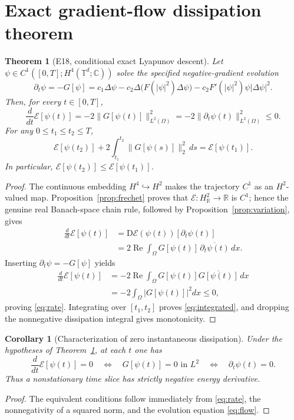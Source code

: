 \documentclass[11pt]{article}
\newtheorem{theorem}{Theorem}
\newtheorem{corollary}{Corollary}
\newcommand{\Om}{\Omega}
\newcommand{\EE}{\mathcal E}
\newcommand{\RR}{\mathbb R}
\newcommand{\CC}{\mathbb C}
\newcommand{\DD}{\mathrm D}
\newcommand{\Rea}{\operatorname{Re}}
\begin{document}
\section{Exact gradient-flow dissipation theorem}
\begin{theorem}[E18, conditional exact Lyapunov descent]\label{thm:E18}
Let $\psi\in C^1([0,T];H^4(\mathbb T^d;\CC))$ solve the specified
negative-gradient evolution
\begin{equation}\label{eq:flow}
\boxed{\displaystyle
 \partial_t\psi=-G[\psi]
 =c_1\Delta\psi
  -c_2\Delta\!\bigl(F(|\psi|^2)\Delta\psi\bigr)
  -c_2F'(|\psi|^2)\psi|\Delta\psi|^2.}
\end{equation}
Then, for every $t\in[0,T]$,
\begin{equation}\label{eq:rate}
\boxed{\displaystyle
 \frac{d}{dt}\EE[\psi(t)]
 =-2\|G[\psi(t)]\|_{L^2(\Om)}^2
 =-2\|\partial_t\psi(t)\|_{L^2(\Om)}^2
 \le0.}
\end{equation}
For any $0\le t_1\le t_2\le T$,
\begin{equation}\label{eq:integrated}
\boxed{\displaystyle
 \EE[\psi(t_2)]
 +2\int_{t_1}^{t_2}\|G[\psi(s)]\|_2^2\,ds
 =\EE[\psi(t_1)] .}
\end{equation}
In particular, $\EE[\psi(t_2)]\le\EE[\psi(t_1)]$.
\end{theorem}
\begin{proof}
The continuous embedding $H^4\hookrightarrow H^2$ makes the
trajectory $C^1$ as an $H^2$-valued map. Proposition~\ref{prop:frechet}
proves that $\EE:H^2_{\RR}\to\RR$ is $C^1$; hence the genuine
real Banach-space chain rule, followed by
Proposition~\ref{prop:variation}, gives
\begin{align}
 \frac{d}{dt}\EE[\psi(t)]
 &=\DD\EE(\psi(t))[\partial_t\psi(t)]\\
 &=2\Rea\int_\Om
       G[\psi(t)]\,\overline{\partial_t\psi(t)}\,dx.
\end{align}
Inserting $\partial_t\psi=-G[\psi]$ yields
\begin{align}
 \frac{d}{dt}\EE[\psi(t)]
 &=-2\Rea\int_\Om G[\psi(t)]\overline{G[\psi(t)]}\,dx\\
 &=-2\int_\Om|G[\psi(t)]|^2dx\le0,
\end{align}
proving \eqref{eq:rate}. Integrating over $[t_1,t_2]$ proves
\eqref{eq:integrated}, and dropping the nonnegative dissipation
integral gives monotonicity.
\end{proof}

\begin{corollary}[Characterization of zero instantaneous dissipation]
Under the hypotheses of Theorem~\ref{thm:E18}, at each $t$ one has
\begin{equation}
 \frac{d}{dt}\EE[\psi(t)]=0
 \quad\Longleftrightarrow\quad
 G[\psi(t)]=0\text{ in }L^2
 \quad\Longleftrightarrow\quad
 \partial_t\psi(t)=0.
\end{equation}
Thus a nonstationary time slice has strictly negative energy derivative.
\end{corollary}
\begin{proof}
The equivalent conditions follow immediately from
\eqref{eq:rate}, the nonnegativity of a squared norm, and the
evolution equation \eqref{eq:flow}.
\end{proof}
\end{document}
